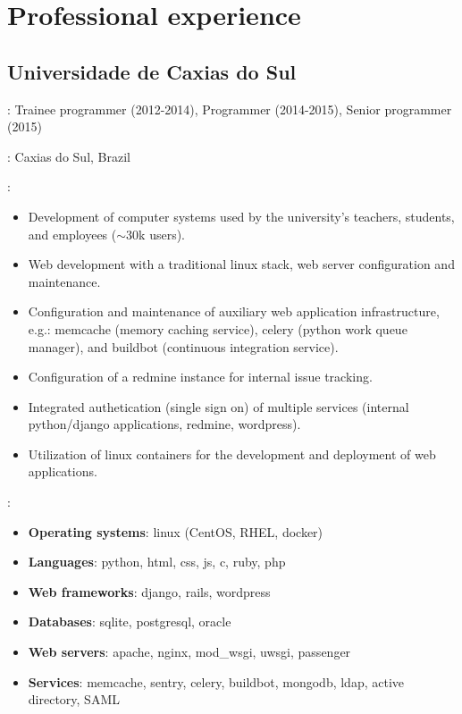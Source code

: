\section*{Professional experience}
\subsection*{Universidade de Caxias do Sul}

\begin{description}[noitemsep]
    \item[Titles]:
        Trainee programmer (2012-2014), Programmer (2014-2015), Senior
        programmer (2015)
    \item[Location]: Caxias do Sul, Brazil
    \item[Attributions]:
        \begin{itemize}[noitemsep]
            \item
                Development of computer systems used by the university's
                teachers, students, and employees ($\sim$30k users).
            \item
                Web development with a traditional linux stack, web server
                configuration and maintenance.
            \item
                Configuration and maintenance of auxiliary web application
                infrastructure, e.g.: memcache (memory caching service), celery
                (python work queue manager), and buildbot (continuous
                integration service).
            \item
                Configuration of a redmine instance for internal issue
                tracking.
            \item
                Integrated authetication (single sign on) of multiple services
                (internal python/django applications, redmine, wordpress).
            \item
                Utilization of linux containers for the development and
                deployment of web applications.
        \end{itemize}
    \item[Technologies]:
        \begin{itemize}[noitemsep]
            \item \textbf{Operating systems}: linux (CentOS, RHEL, docker)
            \item \textbf{Languages}: python, html, css, js, c, ruby, php
            \item \textbf{Web frameworks}: django, rails, wordpress
            \item \textbf{Databases}: sqlite, postgresql, oracle
            \item \textbf{Web servers}:
                apache, nginx, mod\_wsgi, uwsgi, passenger
            \item \textbf{Services}:
                memcache, sentry, celery, buildbot, mongodb, ldap, active
                directory, SAML
        \end{itemize}
\end{description}

